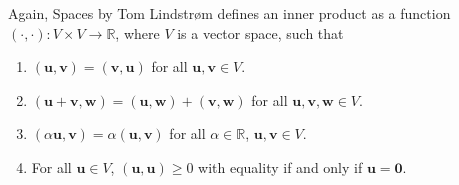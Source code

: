 \begin{solution}
    Again, Spaces by Tom Lindstrøm defines an inner product as a function $(\cdot, \cdot): V \times V \to \mathbb{R}$, where $V$ is a vector space, such that
    \begin{enumerate}[label=(\roman*)] %
        \item $(\boldsymbol{u}, \boldsymbol{v}) = (\boldsymbol{v}, \boldsymbol{u})$ for all $\boldsymbol{u}, \boldsymbol{v} \in V$.

        \item $(\boldsymbol{u} + \boldsymbol{v}, \boldsymbol{w}) = (\boldsymbol{u}, \boldsymbol{w}) + (\boldsymbol{v}, \boldsymbol{w})$ for all $\boldsymbol{u}, \boldsymbol{v}, \boldsymbol{w} \in V$.

        \item $(\alpha \boldsymbol{u}, \boldsymbol{v}) = \alpha (\boldsymbol{u}, \boldsymbol{v})$ for all $\alpha \in \mathbb{R}$, $\boldsymbol{u}, \boldsymbol{v} \in V$.

        \item For all $\boldsymbol{u} \in V$, $(\boldsymbol{u}, \boldsymbol{u}) \geq 0$ with equality if and only if $\boldsymbol{u} = \boldsymbol{0}$.
    \end{enumerate}


\end{solution}
